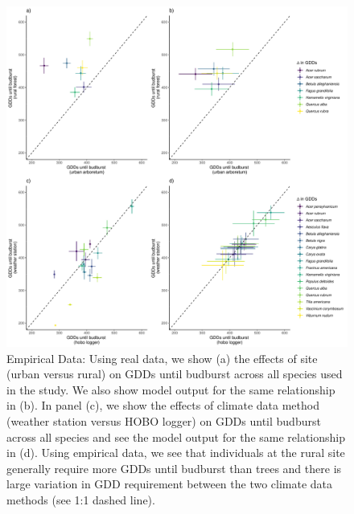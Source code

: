 \documentclass{article}\usepackage[]{graphicx}\usepackage[]{color}
\begin{document}
\begin{figure}[H]
    \centering
    \includegraphics[width=12cm]{..//analyses/figures/speciesdiffs.pdf}
\caption{ Empirical Data: Using real data, we show (a) the effects of site (urban versus rural) on GDDs until budburst across all species used in the study. We also show model output for the same relationship in (b). In panel (c), we show the effects of climate data method (weather station versus HOBO logger) on GDDs until budburst across all species and see the model output for the same relationship in (d). Using empirical data, we see that individuals at the rural site generally require more GDDs until budburst than trees and there is large variation in GDD requirement between the two climate data methods (see 1:1 dashed line).}
\label{fig:sppsdiffs}
\end{figure}


  
  
\end{document}
